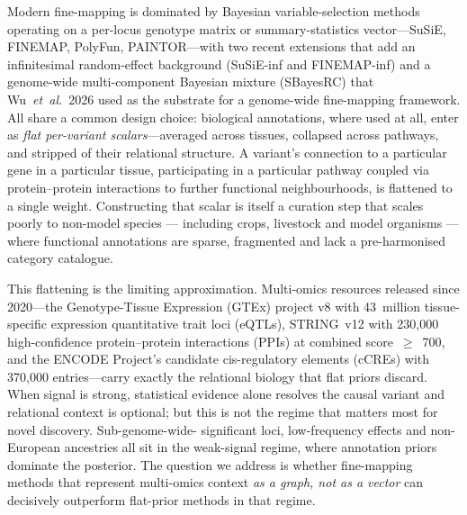 Modern fine-mapping is dominated by Bayesian variable-selection
methods operating on a per-locus genotype matrix or summary-statistics
vector---SuSiE\cite{wang2020simple}, FINEMAP\cite{benner2016finemap},
PolyFun\cite{weissbrod2020polyfun},
PAINTOR\cite{kichaev2014integrating}---with two recent extensions
that add an infinitesimal random-effect background
(SuSiE-inf and FINEMAP-inf)\cite{cui2024improving} and a genome-wide
multi-component Bayesian mixture
(SBayesRC)\cite{zheng2024leveraging} that
Wu~\emph{et~al.}~2026\cite{wu2026genome} used as the substrate for a
genome-wide fine-mapping framework. All share a common design choice:
biological annotations, where used at all, enter as \emph{flat
per-variant scalars}---averaged across tissues, collapsed across
pathways, and stripped of their relational structure. A variant's
connection to a particular gene in a particular tissue, participating
in a particular pathway coupled via protein--protein interactions to
further functional neighbourhoods, is flattened to a single weight.
Constructing that scalar is itself a curation step that scales poorly
to non-model species --- including crops, livestock and model
organisms --- where functional annotations are sparse, fragmented
and lack a pre-harmonised category catalogue.

This flattening is the limiting approximation. Multi-omics resources
released since 2020---the Genotype-Tissue Expression (GTEx) project
v8 with 43~million tissue-specific expression quantitative trait
loci (eQTLs)\cite{gtex2020}, STRING~v12 with 230{,}000 high-confidence
protein--protein interactions (PPIs) at combined
score~$\geq$~700\cite{szklarczyk2023string}, and the ENCODE Project's
candidate cis-regulatory elements (cCREs) with 370{,}000
entries\cite{encode2020expanded}---carry exactly the relational
biology that flat priors discard. When signal is strong, statistical evidence alone resolves
the causal variant and relational context is optional; but this is
not the regime that matters most for novel discovery. Sub-genome-wide-
significant loci, low-frequency effects and non-European ancestries
all sit in the weak-signal regime, where annotation priors dominate
the posterior. The question we address is whether fine-mapping
methods that represent multi-omics context \emph{as a graph, not as a
vector} can decisively outperform flat-prior methods in that regime.

